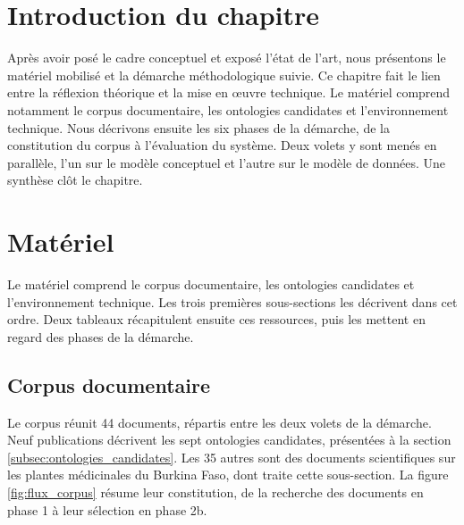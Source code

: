
\section*{Introduction du chapitre}

Après avoir posé le cadre conceptuel et exposé l'état de l'art, nous présentons le matériel mobilisé et la démarche méthodologique suivie. Ce chapitre fait le lien entre la réflexion théorique et la mise en œuvre technique. Le matériel comprend notamment le corpus documentaire, les ontologies candidates et l'environnement technique. Nous décrivons ensuite les six phases de la démarche, de la constitution du corpus à l'évaluation du système. Deux volets y sont menés en parallèle, l'un sur le modèle conceptuel et l'autre sur le modèle de données. Une synthèse clôt le chapitre.


\section{Matériel}
\label{sec:materiel}

Le matériel comprend le corpus documentaire, les ontologies candidates et l'environnement technique. Les trois premières sous-sections les décrivent dans cet ordre. Deux tableaux récapitulent ensuite ces ressources, puis les mettent en regard des phases de la démarche.


\subsection{Corpus documentaire}
\label{subsec:corpus}

Le corpus réunit 44 documents, répartis entre les deux volets de la démarche. Neuf publications décrivent les sept ontologies candidates, présentées à la section \ref{subsec:ontologies_candidates}. Les 35 autres sont des documents scientifiques sur les plantes médicinales du Burkina Faso, dont traite cette sous-section. La figure \ref{fig:flux_corpus} résume leur constitution, de la recherche des documents en phase 1 à leur sélection en phase 2b.

